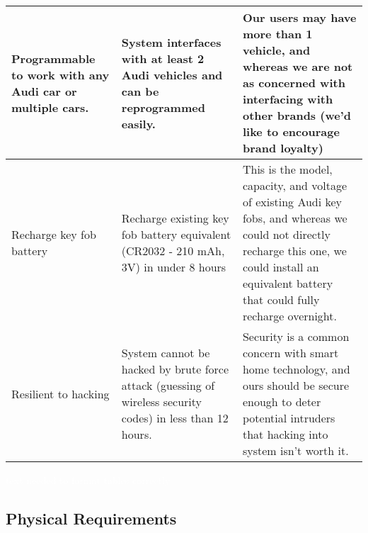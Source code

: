 \begin{center}
\begin{supertabular}{| p{32mm} | p{50mm} | p{53mm} | }
        \hline Programmable to work with any Audi car or multiple cars. & System interfaces with at least 2 Audi vehicles and can be reprogrammed easily. & Our users may have more than 1 vehicle, and whereas we are not as concerned with interfacing with other brands (we'd like to encourage brand loyalty) \\
        \hline Recharge key fob battery & Recharge existing key fob battery equivalent (CR2032 - 210 mAh, 3V) in under 8 hours & This is the model, capacity, and voltage of existing Audi key fobs, and whereas we could not directly recharge this one, we could install an equivalent battery that could fully recharge overnight.\\
        \hline Resilient to hacking & System cannot be hacked by brute force attack (guessing of wireless security codes) in less than 12 hours. & Security is a common concern with smart home technology, and ours should be secure enough to deter potential intruders that hacking into system isn't worth it.\\
\end{supertabular}
\end{center}

\textcolor{white}{text needed to format tables correctly}

\subsection*{Physical Requirements}

